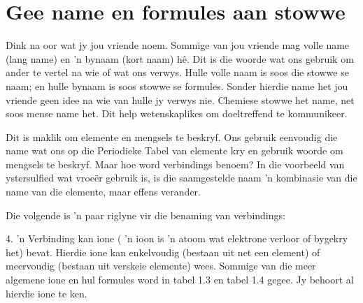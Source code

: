             \section{Gee name en formules aan stowwe}
            \nopagebreak
      \label{m38708*eip-379}Dink na oor wat jy jou vriende noem. Sommige van jou vriende mag volle name (lang name) en 'n bynaam (kort naam) hê. Dit is die woorde wat ons gebruik om ander te vertel na wie of wat ons verwys. Hulle volle naam is soos die stowwe se naam; en hulle bynaam is soos stowwe se formules. Sonder hierdie name het jou vriende geen idee na wie van hulle jy verwys nie. Chemiese stowwe het name, net soos mense name het. Dit help wetenskaplikes om doeltreffend te kommunikeer. 
     \par \label{m38708*id64028}Dit is maklik om elemente en mengsels te beskryf. Ons gebruik eenvoudig die name wat ons op die Periodieke Tabel van elemente kry en gebruik woorde om mengsels te beskryf. Maar hoe word verbindings benoem? In die voorbeeld van ystersulfied wat vroeër gebruik is, is die saamgestelde naam 'n kombinasie van die name van die elemente, maar effens verander. \par 


      \label{m38708*id64033}Die volgende is 'n paar riglyne vir die benaming van verbindings:\par 


4. 'n Verbinding kan ione ( 'n ioon is 'n atoom wat elektrone verloor of bygekry het) bevat. Hierdie ione kan enkelvoudig (bestaan uit net een element) of meervoudig (bestaan uit verskeie elemente) wees. Sommige van die meer algemene ione en hul formules word in tabel 1.3 en tabel 1.4 gegee. Jy behoort al hierdie ione te ken.

